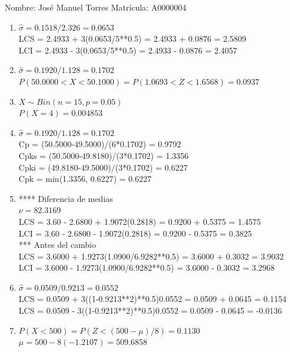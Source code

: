 \documentclass[8pt]{report}
\begin{document}
 \newpage

Nombre: \underline{\hspace*{.2in}}
José Manuel Torres
\underline{\hspace*{.2in}} \quad Matr\'icula:\underline{\hspace*{.2in}}
A0000004
\underline{\hspace*{.2in}} \\

\begin{enumerate}
\item $\hat\sigma = 0.1518/2.326 = 0.0653$\\
LCS = 2.4933 + 3(0.0653/5**0.5) = 2.4933 + 0.0876 = 2.5809\\
LCI = 2.4933 - 3(0.0653/5**0.5) = 2.4933 - 0.0876 = 2.4057
\item $\hat\sigma = 0.1920/1.128 = 0.1702$\\
$P(50.0000 < X < 50.1000) = P(1.0693 < Z < 1.6568) = 0.0937$\\
\item $X \sim Bin(n=15, p=0.05)$\\
$P(X = 4) = 0.004853$
\item $\hat\sigma = 0.1920/1.128 = 0.1702$\\
Cp = (50.5000-49.5000)/(6*0.1702) = 0.9792\\
Cpks = (50.5000-49.8180)/(3*0.1702) = 1.3356\\
Cpki = (49.8180-49.5000)/(3*0.1702) = 0.6227\\
Cpk = min(1.3356, 0.6227) = 0.6227
\item **** Diferencia de medias\\
$\nu = 82.3169$\\
LCS = 3.60 - 2.6800 + 1.9072(0.2818) = 0.9200 + 0.5375 = 1.4575\\
LCI = 3.60 - 2.6800 - 1.9072(0.2818) = 0.9200 - 0.5375 = 0.3825\\
*** Antes del cambio\\
LCS = 3.6000 + 1.9273(1.0900/6.9282**0.5) = 3.6000 + 0.3032 = 3.9032\\
LCI = 3.6000 - 1.9273(1.0900/6.9282**0.5) = 3.6000 - 0.3032 = 3.2968\\
\item $\hat\sigma = 0.0509/0.9213 = 0.0552$\\
LCS = 0.0509 + 3((1-0.9213**2)**0.5)0.0552 = 0.0509 + 0.0645 = 0.1154\\
LCS = 0.0509 - 3((1-0.9213**2)**0.5)0.0552 = 0.0509 - 0.0645 = -0.0136
\item $P(X < 500) = P(Z < (500-\mu)/8) = 0.1130$\\
$\mu = 500 - 8(-1.2107) = 509.6858$\\
\end{enumerate}
\end{document}

